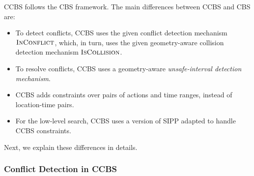 \documentclass[review]{elsarticle}
\newcommand\konstantin[1]{\nb{\textbf{Konstantin:}}{red}{#1}}
\newcommand\roni[1]{\nb{\textbf{Roni:}}{green}{#1}}
\newcommand{\ccbs}{\ac{CCBS}\xspace}
\newcommand{\cbs}{\ac{CBS}\xspace}
\newcommand{\sipp}{\ac{SIPP}\xspace}
\newcommand{\iscollision}{\textsc{IsCollision}\xspace}
\newcommand{\inconflict}{\textsc{InConflict}\xspace}
\begin{document}
\ccbs follows the \cbs framework. %
The main differences between \ccbs and \cbs are:
\begin{itemize}
    \item To detect conflicts, \ccbs uses the given conflict detection mechanism $\inconflict$, which, in turn, uses the given geometry-aware collision detection mechanism $\iscollision$. 
    
    
    \item To resolve conflicts, \ccbs uses a geometry-aware \emph{unsafe-interval detection mechanism}.
    \item \ccbs adds constraints over pairs of actions and time ranges, instead of location-time pairs.
    \item For the low-level search, \ccbs uses a version of \sipp adapted to handle \ccbs constraints. %
    
\end{itemize}
\noindent Next, we explain these differences in details. 



\subsubsection{Conflict Detection in \ccbs}
\end{document}
